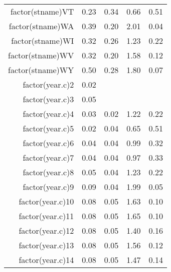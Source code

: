 \begin{table}[ht]
\begin{tabular}{rrrrr}
  factor(stname)VT & 0.23 & 0.34 & 0.66 & 0.51 \\ 
  factor(stname)WA & 0.39 & 0.20 & 2.01 & 0.04 \\ 
  factor(stname)WI & 0.32 & 0.26 & 1.23 & 0.22 \\ 
  factor(stname)WV & 0.32 & 0.20 & 1.58 & 0.12 \\ 
  factor(stname)WY & 0.50 & 0.28 & 1.80 & 0.07 \\ 
  factor(year.c)2 & 0.02 &  &  &  \\ 
  factor(year.c)3 & 0.05 &  &  &  \\ 
  factor(year.c)4 & 0.03 & 0.02 & 1.22 & 0.22 \\ 
  factor(year.c)5 & 0.02 & 0.04 & 0.65 & 0.51 \\ 
  factor(year.c)6 & 0.04 & 0.04 & 0.99 & 0.32 \\ 
  factor(year.c)7 & 0.04 & 0.04 & 0.97 & 0.33 \\ 
  factor(year.c)8 & 0.05 & 0.04 & 1.23 & 0.22 \\ 
  factor(year.c)9 & 0.09 & 0.04 & 1.99 & 0.05 \\ 
  factor(year.c)10 & 0.08 & 0.05 & 1.63 & 0.10 \\ 
  factor(year.c)11 & 0.08 & 0.05 & 1.65 & 0.10 \\ 
  factor(year.c)12 & 0.08 & 0.05 & 1.40 & 0.16 \\ 
  factor(year.c)13 & 0.08 & 0.05 & 1.56 & 0.12 \\ 
  factor(year.c)14 & 0.08 & 0.05 & 1.47 & 0.14 \\ 
   \hline
\end{tabular}
\end{table}
